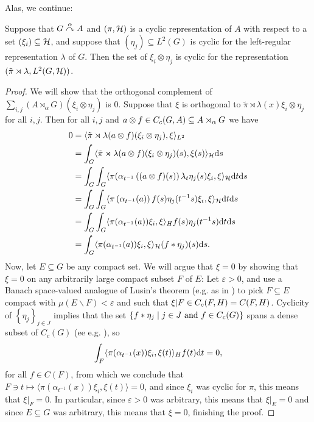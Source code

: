 Alas, we continue:
\begin{lemma}
	Suppose that $G \stackrel{\alpha}{\curvearrowright} A$ and $(\pi,\mathcal{H})$ is a cyclic representation of $A$ with respect to a set $(\xi_i) \subseteq \mathcal{H}$, and suppose that $(\eta_j) \subseteq L^2(G)$ is cyclic for the left-regular representation $\lambda$ of $G$. Then the set of $\xi_i \otimes \eta_j$ is cyclic for the representation $(\tilde \pi \rtimes \lambda, L^2(G,\mathcal{H}))$.
	\label{mult:cyclic1}
\end{lemma}
\begin{proof}
	We will show that the orthogonal complement of $\sum_{i,j} (A \rtimes_\alpha G)(\xi_i \otimes \eta_j)$ is $0$. Suppose that $\xi$ is orthogonal to $\tilde \pi \rtimes \lambda(x) \xi_i \otimes \eta_j$ for all $i,j$. Then for all $i,j$ and $a \otimes f \in C_c(G,A) \subseteq A \rtimes_\alpha G$ we have
	\begin{align*}
		0 &= \langle \tilde \pi \rtimes \lambda (a \otimes f) (\xi_i \otimes \eta_j) , \xi \rangle_{L^2}\\
		&= \int_G \langle \tilde \pi \rtimes \lambda (a \otimes f) (\xi_i \otimes \eta_j)(s) , \xi(s)\rangle_{\mathcal{H}} \mathrm{d} s \\
		&= \int_G \int_G \langle \pi(\alpha_{t^{-1}}\left( (a \otimes f)(s) \right) \lambda_t \eta_j(s) \xi_i , \xi \rangle_{\mathcal{H}} \mathrm{d} t \mathrm{d} s\\
		&= \int_G \int_G \langle \pi\left( \alpha_{t^{-1}} (a) \right) f(s) \eta_j(t^{-1}s) \xi_i , \xi \rangle_{\mathcal{H}} \mathrm{d} t\mathrm{d} s\\
		&= \int_G \int_G \langle \pi( \alpha_{t^{-1}}(a) ) \xi_i , \xi \rangle_H f(s) \eta_j(t^{-1}s) \mathrm{d} t \mathrm{d} s \\
		&= \int_G \langle \pi(\alpha_{t^{-1}}(a)) \xi_i , \xi \rangle_{\mathcal{H}} (f \ast \eta_j)(s) \mathrm{d} s.
	\end{align*}
	Now, let $E \subseteq G$ be any compact set. We will argue that $\xi = 0$ by showing that $\xi = 0$ on any arbitrarily large compact subset $F$ of $E$: Let $\varepsilon > 0$, and use a Banach space-valued analogue of Lusin's theorem (e.g. as in \cite[Appendix B]{williamscrossed}) to pick $F \subseteq E$ compact with $\mu(E\backslash F) < \varepsilon$ and such that $\xi|F \in C_c(F,H)=C(F,H)$. Cyclicity of $\left\{ \eta_j \right\}_{j \in J}$ implies that the set $\{f \ast \eta_j \mid j \in J \text{ and } f \in C_c(G)\}$ spans a dense subset of $C_c(G)$ (ee e.g. \cite[Proposition 3.33]{folland2016fourier}), so
	\begin{align*}
		\int_{F} \langle \pi(\alpha_{t^{-1}}(x)) \xi_i , \xi(t) \rangle_H f(t) \mathrm{d} t = 0,
	\end{align*}
	for all $f \in C(F)$, from which we conclude that $F \ni t \mapsto \langle \pi(\alpha_{t^{-1}}(x)) \xi_i , \xi(t) \rangle=0$, and since $\xi_i$ was cyclic for $\pi$, this means that $\xi|_F = 0$. In particular, since $\varepsilon > 0$ was arbitrary, this means that $\xi|_E = 0$ and since $E \subseteq G$ was arbitrary, this means that $\xi = 0$, finishing the proof.
\end{proof}

